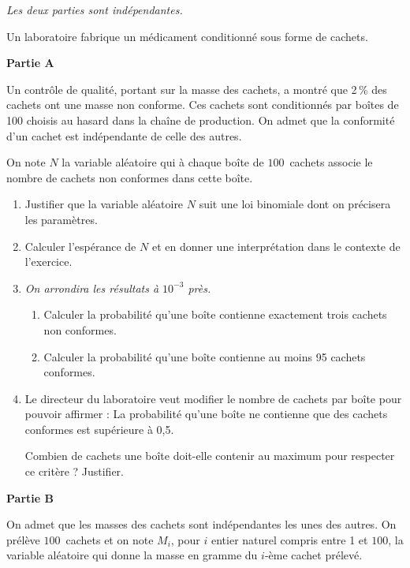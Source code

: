 \medskip

\textit{Les deux parties sont indépendantes.}

\smallskip

Un laboratoire fabrique un médicament conditionné sous forme de cachets.

\begin{center}
\textbf{Partie A}
\end{center}

Un contrôle de qualité, portant sur la masse des cachets, a montré que 2\,\% des cachets ont une masse non conforme. Ces cachets sont conditionnés par boîtes de 100 choisis au hasard dans la chaîne de production. On admet que la conformité d'un cachet est indépendante de celle des autres.

\smallskip

On note $N$ la variable aléatoire qui à chaque boîte de $100$~cachets associe le nombre de cachets non conformes dans cette boîte.

\begin{enumerate}
	\item Justifier que la variable aléatoire $N$ suit une loi binomiale dont on précisera les paramètres.
	\item Calculer l'espérance de $N$ et en donner une interprétation dans le contexte de l'exercice.
	\item \textit{On arrondira les résultats à $10^{-3}$ près.}
	\begin{enumerate}
		\item Calculer la probabilité qu'une boîte contienne exactement trois cachets non
		conformes.
		\item Calculer la probabilité qu'une boîte contienne au moins 95 cachets conformes.
	\end{enumerate}
	\item Le directeur du laboratoire veut modifier le nombre de cachets par boîte pour pouvoir affirmer : \og La probabilité qu'une boîte ne contienne que des cachets conformes est supérieure à 0,5\fg.
	
Combien de cachets une boîte doit-elle contenir au maximum pour respecter ce critère ? Justifier.
\end{enumerate}

\begin{center}
	\textbf{Partie B}
\end{center}

On admet que les masses des cachets sont indépendantes les unes des autres. On prélève 
$100$~cachets et on note $M_i$, pour $i$ entier naturel compris entre 1 et $100$, la variable aléatoire qui donne la masse en gramme du $i$-ème cachet prélevé.

